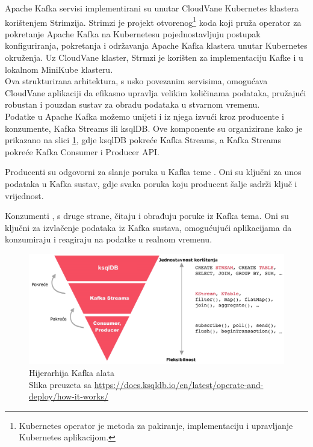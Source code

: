 \documentclass[times, utf8, diplomski]{fer}
\begin{document}
Apache Kafka servisi implementirani su unutar CloudVane Kubernetes klastera korištenjem Strimzija. Strimzi je projekt otvorenog\footnote{Kubernetes operator je metoda za pakiranje, implementaciju i upravljanje Kubernetes aplikacijom.} koda koji pruža operator za pokretanje Apache Kafka na Kubernetesu pojednostavljuju postupak konfiguriranja, pokretanja i održavanja Apache Kafka klastera unutar Kubernetes okruženja. Uz CloudVane klaster, Strmzi je korišten za implementaciju Kafke i u lokalnom MiniKube klasteru.\\

Ova strukturirana arhitektura, s usko povezanim servisima, omogućava CloudVane aplikaciji da efikasno upravlja velikim količinama podataka, pružajući robustan i pouzdan sustav za obradu podataka u stvarnom vremenu.\\

Podatke u Apache Kafka možemo unijeti i iz njega izvući kroz producente i konzumente, Kafka Streams ili ksqlDB. Ove komponente su organizirane kako je prikazano na slici \ref{fig:ksqldb_streams}, gdje ksqlDB pokreće Kafka Streams, a Kafka Streams pokreće Kafka Consumer i Producer API.

Producenti  su odgovorni za slanje poruka u Kafka teme . Oni su ključni za unos podataka u Kafka sustav, gdje svaka poruka koju producent šalje sadrži ključ i vrijednost.

Konzumenti , s druge strane, čitaju i obrađuju poruke iz Kafka tema. Oni su ključni za izvlačenje podataka iz Kafka sustava, omogućujući aplikacijama da konzumiraju i reagiraju na podatke u realnom vremenu.

\begin{figure}[htb]
\centering
\includegraphics[width=13cm]{images/ksql_streams_consumer.png}
\caption[Hijerarhija Kafka alata]{Hijerarhija Kafka alata\\Slika preuzeta sa \url{https://docs.ksqldb.io/en/latest/operate-and-deploy/how-it-works/}}
\label{fig:ksqldb_streams}
\end{figure}
\end{document}
